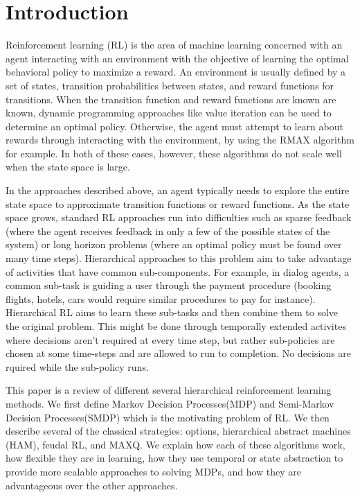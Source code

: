 \section{Introduction}

Reinforcement learning (RL) is the area of machine learning concerned with an agent interacting with an environment with the objective of learning the optimal behavioral policy to maximize a reward. An environment is usually defined by a set of states, transition probabilities between states, and reward functions for transitions. When the transition function and reward functions are known are known, dynamic programming approaches like value iteration can be used to determine an optimal policy. Otherwise, the agent must attempt to learn about rewards through interacting with the environment, by using the RMAX algorithm for example. In both of these cases, however, these algorithms do not scale well when the state space is large. 

In the approaches described above, an agent typically needs to explore the entire state space to approximate transition functions or reward functions. As the state space grows, standard RL approaches run into difficulties such as sparse feedback  (where the agent receives feedback in only a few of the possible states of the system) or  long horizon problems (where an optimal policy must be found over many time steps).  Hierarchical approaches to this problem aim to take advantage of activities that have common sub-components. For example, in dialog agents, a common sub-task is guiding a user through the payment procedure (booking flights, hotels, cars would require similar procedures to pay for instance). Hierarchical RL aims to learn these sub-tasks and then combine them to solve the original problem. This might be done through temporally extended activites where decisions aren't required at every time step, but rather sub-policies are chosen at some time-steps and are allowed to run to completion. No decisions are rquired while the sub-policy runs.   

This paper is a review of different several hierarchical reinforcement learning methods. We first define Markov Decision Processes(MDP) and Semi-Markov Decision Processes(SMDP) which is the motivating problem of RL. We then describe several of the classical strategies: options, hierarchical abstract machines (HAM), feudal RL, and MAXQ. We explain how each of these algorithms work, how flexible they are in learning, how they use temporal or state abstraction to provide more scalable approaches to solving MDPs, and how they are advantageous over the other approaches. 


